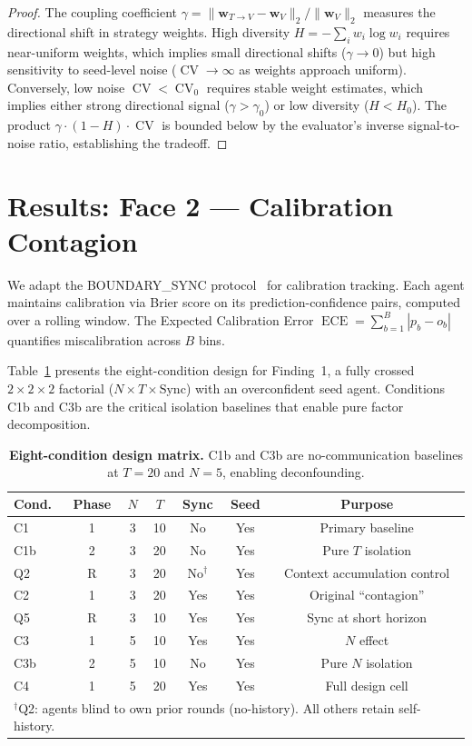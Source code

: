 \documentclass[11pt]{article}
\DeclareMathOperator{\CV}{CV}
\DeclareMathOperator{\ECE}{ECE}
\begin{document}
\begin{proof}
The coupling coefficient $\gamma = \|\mathbf{w}_{T\to V} - \mathbf{w}_V\|_2 / \|\mathbf{w}_V\|_2$ measures the directional shift in strategy weights. High diversity $H = -\sum_i w_i \log w_i$ requires near-uniform weights, which implies small directional shifts ($\gamma \to 0$) but high sensitivity to seed-level noise ($\CV \to \infty$ as weights approach uniform). Conversely, low noise $\CV < \CV_0$ requires stable weight estimates, which implies either strong directional signal ($\gamma > \gamma_0$) or low diversity ($H < H_0$). The product $\gamma \cdot (1-H) \cdot \CV$ is bounded below by the evaluator's inverse signal-to-noise ratio, establishing the tradeoff.
\end{proof}

\section{Results: Face 2 --- Calibration Contagion}

We adapt the BOUNDARY\_SYNC protocol~\citep{boundarysync2026} for calibration tracking. Each agent maintains calibration via Brier score on its prediction-confidence pairs, computed over a rolling window. The Expected Calibration Error $\ECE = \sum_{b=1}^{B} |p_b - o_b|$ quantifies miscalibration across $B$ bins.

Table~\ref{tab:design} presents the eight-condition design for Finding~1, a fully crossed $2 \times 2 \times 2$ factorial ($N \times T \times \text{Sync}$) with an overconfident seed agent. Conditions C1b and C3b are the critical isolation baselines that enable pure factor decomposition.

\begin{table}[H]
\centering
\caption{\textbf{Eight-condition design matrix.} C1b and C3b are no-communication baselines at $T{=}20$ and $N{=}5$, enabling deconfounding.}
\label{tab:design}
\begin{tabular}{@{}lcccccc@{}}
\toprule
Cond. & Phase & $N$ & $T$ & Sync & Seed & Purpose \\
\midrule
C1  & 1 & 3 & 10 & No  & Yes & Primary baseline \\
C1b & 2 & 3 & 20 & No  & Yes & Pure $T$ isolation \\
Q2  & R & 3 & 20 & No$^\dagger$ & Yes & Context accumulation control \\
C2  & 1 & 3 & 20 & Yes & Yes & Original ``contagion'' \\
Q5  & R & 3 & 10 & Yes & Yes & Sync at short horizon \\
C3  & 1 & 5 & 10 & Yes & Yes & $N$ effect \\
C3b & 2 & 5 & 10 & No  & Yes & Pure $N$ isolation \\
C4  & 1 & 5 & 20 & Yes & Yes & Full design cell \\
\bottomrule
\multicolumn{7}{l}{\footnotesize $^\dagger$Q2: agents blind to own prior rounds (no-history). All others retain self-history.} \\
\end{tabular}
\end{table}
\end{document}
